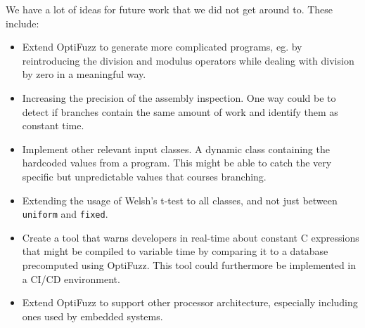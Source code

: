 We have a lot of ideas for future work that we did not get around to. These include:
\begin{itemize}
    \setlength\itemsep{-0.6em}
    \item Extend OptiFuzz to generate more complicated programs, eg. by reintroducing the division and modulus operators while dealing with division by zero in a meaningful way.
    \item Increasing the precision of the assembly inspection. One way could be to detect if branches contain the same amount of work and identify them as constant time.
    \item Implement other relevant input classes. A dynamic class containing the hardcoded values from a program. This might be able to catch the very specific but unpredictable values that courses branching.
    \item Extending the usage of Welsh's t-test to all classes, and not just between \texttt{uniform} and \texttt{fixed}.
    \item Create a tool that warns developers in real-time about constant C expressions that might be compiled to variable time by comparing it to a database precomputed using OptiFuzz. This tool could furthermore be implemented in a CI/CD environment.
    \item Extend OptiFuzz to support other processor architecture, especially including ones used by embedded systems.
\end{itemize}

